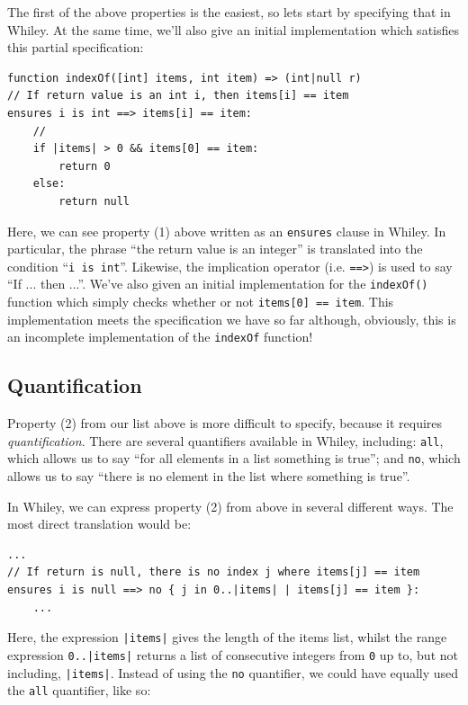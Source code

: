 The first of the above properties is the easiest, so lets start by
specifying that in Whiley.  At the same time, we'll also give an
initial implementation which satisfies this partial specification:

\begin{lstlisting}
function indexOf([int] items, int item) => (int|null r)
// If return value is an int i, then items[i] == item
ensures i is int ==> items[i] == item:
    //
    if |items| > 0 && items[0] == item:
        return 0
    else:
        return null
\end{lstlisting}

Here, we can see property (1) above written as an \lstinline{ensures}
clause in Whiley.  In particular, the phrase ``the return value is an
integer'' is translated into the condition ``\lstinline{i is int}''.
Likewise, the implication operator (i.e. \lstinline{==>}) is used to
say ``If ... then ...''.  We've also given an initial implementation
for the \lstinline{indexOf()} function which simply checks whether or
not \lstinline{items[0] == item}.  This implementation meets the
specification we have so far although, obviously, this is an
incomplete implementation of the \lstinline{indexOf} function!

\subsection{Quantification}
Property (2) from our list above is more difficult to specify, because
it requires {\em quantification}.  There are several quantifiers
available in Whiley, including: \lstinline{all}, which allows us to
say ``for all elements in a list something is true''; and
\lstinline{no}, which allows us to say ``there is no element in the list
where something is true''. 

In Whiley, we can express property (2) from above in several different
ways.  The most direct translation would be:

\begin{lstlisting}
...
// If return is null, there is no index j where items[j] == item
ensures i is null ==> no { j in 0..|items| | items[j] == item }:
    ...
\end{lstlisting}

\noindent Here, the expression \lstinline{|items|} gives the length of
the items list, whilst the range expression \lstinline{0..|items|}
returns a list of consecutive integers from \lstinline{0} up to, but
not including, \lstinline{|items|}.  Instead of using the
\lstinline{no} quantifier, we could have equally used the
\lstinline{all} quantifier, like so:

